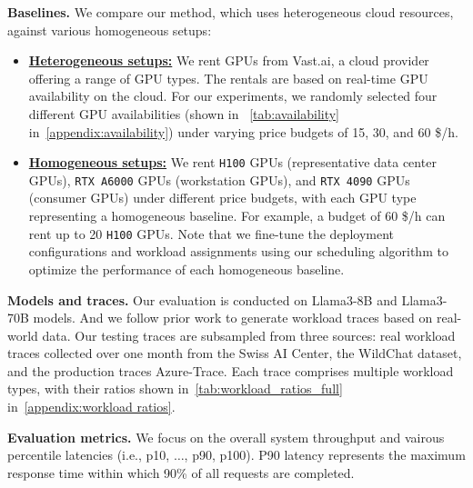\textbf{Baselines.} We compare our method, which uses heterogeneous cloud resources, against various homogeneous setups:
\begin{itemize}[topsep=5pt, leftmargin=*]
    \vspace{-0.5em}
    \item \textbf{\underline{Heterogeneous setups:}} We rent GPUs from Vast.ai, a cloud provider offering a range of GPU types. The rentals are based on real-time GPU availability on the cloud. For our experiments, we randomly selected four different GPU availabilities (shown in ~\autoref{tab:availability} in~\autoref{appendix:availability}) under varying price budgets of 15, 30, and 60 \$/h.
    \vspace{-0.5em}
    \item \textbf{\underline{Homogeneous setups:}} We rent \texttt{H100} GPUs (representative data center GPUs), \texttt{RTX A6000} GPUs (workstation GPUs), and \texttt{RTX 4090} GPUs (consumer GPUs) under different price budgets, with each GPU type representing a homogeneous baseline. For example, a budget of 60 \$/h can rent up to 20 \texttt{H100} GPUs. Note that we fine-tune the deployment configurations and workload assignments using our scheduling algorithm to optimize the performance of each homogeneous baseline.
    \vspace{-0.5em}
\end{itemize}

\textbf{Models and traces.} Our evaluation is conducted on Llama3-8B and Llama3-70B models.
And we follow prior work to generate workload traces based on real-world data. Our testing traces are subsampled from three sources: real workload traces collected over one month from the Swiss AI Center, 
the WildChat dataset,
and the production traces Azure-Trace.
Each trace comprises multiple workload types, with their ratios shown in~\autoref{tab:workload_ratios_full} in~\autoref{appendix:workload ratios}.

\textbf{Evaluation metrics.} We focus on the overall system throughput and vairous percentile latencies (i.e., p10, $\dots$, p90, p100). P90 latency represents the maximum response time within which 90\% of all requests are completed. 

